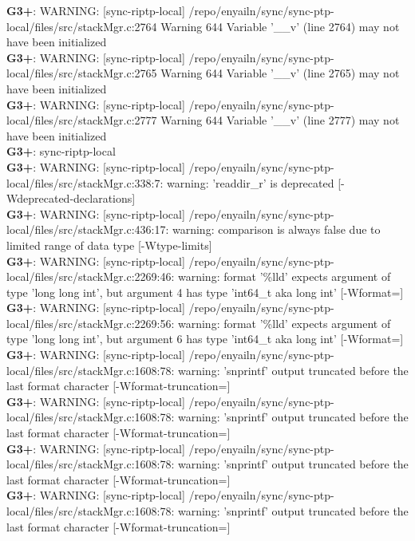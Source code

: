\documentclass[12pt,twoside]{article}
\begin{document}
\textbf{G3+}: WARNING: [sync-riptp-local] /repo/enyailn/sync/sync-ptp-local/files/src/stackMgr.c:2764 Warning 644 Variable '\_\_v' (line 2764) may not have been initialized\\ 
\textbf{G3+}: WARNING: [sync-riptp-local] /repo/enyailn/sync/sync-ptp-local/files/src/stackMgr.c:2765 Warning 644 Variable '\_\_v' (line 2765) may not have been initialized\\ 
\textbf{G3+}: WARNING: [sync-riptp-local] /repo/enyailn/sync/sync-ptp-local/files/src/stackMgr.c:2777 Warning 644 Variable '\_\_v' (line 2777) may not have been initialized\\ 
  
\textbf{G3+}: sync-riptp-local\\ 
\textbf{G3+}: WARNING: [sync-riptp-local] /repo/enyailn/sync/sync-ptp-local/files/src/stackMgr.c:338:7: warning: 'readdir\_r' is deprecated [-Wdeprecated-declarations]\\ 
\textbf{G3+}: WARNING: [sync-riptp-local] /repo/enyailn/sync/sync-ptp-local/files/src/stackMgr.c:436:17: warning: comparison is always false due to limited range of data type [-Wtype-limits]\\ 
\textbf{G3+}: WARNING: [sync-riptp-local] /repo/enyailn/sync/sync-ptp-local/files/src/stackMgr.c:2269:46: warning: format '\%lld' expects argument of type 'long long int', but argument 4 has type 'int64\_t {aka long int}' [-Wformat=]\\ 
\textbf{G3+}: WARNING: [sync-riptp-local] /repo/enyailn/sync/sync-ptp-local/files/src/stackMgr.c:2269:56: warning: format '\%lld' expects argument of type 'long long int', but argument 6 has type 'int64\_t {aka long int}' [-Wformat=]\\ 
\textbf{G3+}: WARNING: [sync-riptp-local] /repo/enyailn/sync/sync-ptp-local/files/src/stackMgr.c:1608:78: warning: 'snprintf' output truncated before the last format character [-Wformat-truncation=]\\ 
\textbf{G3+}: WARNING: [sync-riptp-local] /repo/enyailn/sync/sync-ptp-local/files/src/stackMgr.c:1608:78: warning: 'snprintf' output truncated before the last format character [-Wformat-truncation=]\\ 
\textbf{G3+}: WARNING: [sync-riptp-local] /repo/enyailn/sync/sync-ptp-local/files/src/stackMgr.c:1608:78: warning: 'snprintf' output truncated before the last format character [-Wformat-truncation=]\\ 
\textbf{G3+}: WARNING: [sync-riptp-local] /repo/enyailn/sync/sync-ptp-local/files/src/stackMgr.c:1608:78: warning: 'snprintf' output truncated before the last format character [-Wformat-truncation=]\\ 
\end{document}

